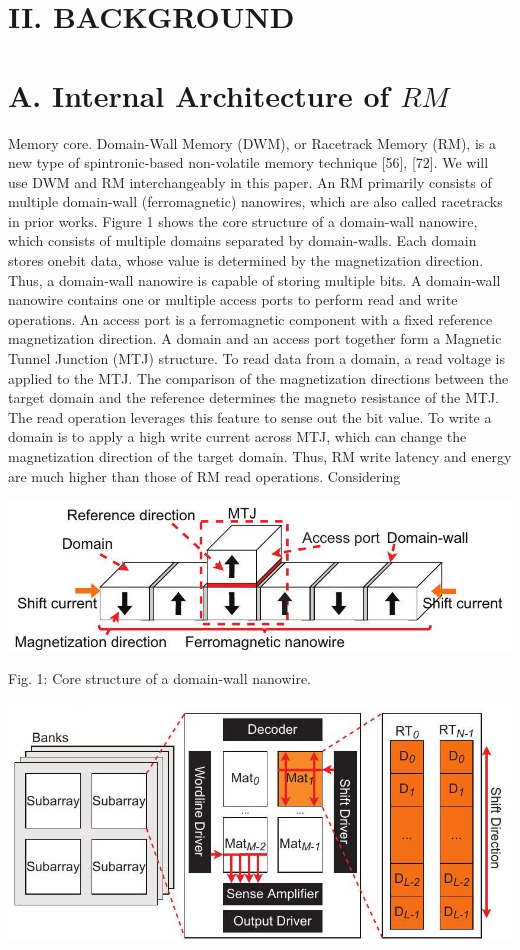 \documentclass[10pt]{article}
\begin{document}
\section*{II. BACKGROUND}
\section*{A. Internal Architecture of $R M$}
Memory core. Domain-Wall Memory (DWM), or Racetrack Memory (RM), is a new type of spintronic-based non-volatile memory technique [56], [72]. We will use DWM and RM interchangeably in this paper. An RM primarily consists of multiple domain-wall (ferromagnetic) nanowires, which are also called racetracks in prior works. Figure 1 shows the core structure of a domain-wall nanowire, which consists of multiple domains separated by domain-walls. Each domain stores onebit data, whose value is determined by the magnetization direction. Thus, a domain-wall nanowire is capable of storing multiple bits. A domain-wall nanowire contains one or multiple access ports to perform read and write operations. An access port is a ferromagnetic component with a fixed reference magnetization direction. A domain and an access port together form a Magnetic Tunnel Junction (MTJ) structure. To read data from a domain, a read voltage is applied to the MTJ. The comparison of the magnetization directions between the target domain and the reference determines the magneto resistance of the MTJ. The read operation leverages this feature to sense out the bit value. To write a domain is to apply a high write current across MTJ, which can change the magnetization direction of the target domain. Thus, RM write latency and energy are much higher than those of RM read operations. Considering

\begin{center}
\includegraphics[max width=\textwidth]{2024_05_12_abeba8a85da5b5ec4c7bg-03(1)}
\end{center}

Fig. 1: Core structure of a domain-wall nanowire.

\begin{center}
\includegraphics[max width=\textwidth]{2024_05_12_abeba8a85da5b5ec4c7bg-03(5)}
\end{center}
\end{document}
